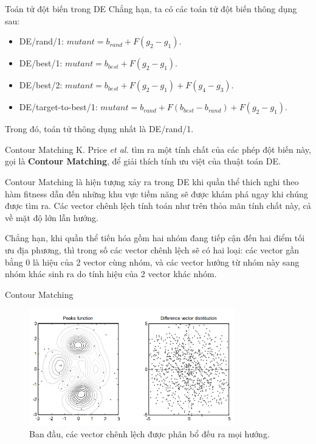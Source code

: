 \begin{frame}{Toán tử đột biến trong DE}
  Chẳng hạn, ta có các toán tử đột biến thông dụng sau:
\begin{itemize}
  \item DE/rand/1: \( mutant = b_{rand} + F(g_{2} - g_{1}) \).
\item DE/best/1: \( mutant = b_{best} + F(g_{2} - g_{1}) \).
\item DE/best/2: \( mutant = b_{best} + F(g_{2} - g_{1}) + F(g_{4} - g_{3}) \).
\item DE/target-to-best/1: \( mutant = b_{rand} + F(b_{best} - b_{rand}) +
  F(g_{2} - g_{1}) \).
\end{itemize}

Trong đó, toán tử thông dụng nhất là DE/rand/1.

\end{frame}

\begin{frame}{Contour Matching}
  K. Price \textit{et al.} tìm ra một tính chất của các phép đột biến này, gọi là
  \textbf{Contour Matching}, để giải thích tính ưu việt của thuật toán DE.

  Contour Matching là hiện tượng xảy ra trong DE khi quần thể thich nghi theo
  hàm fitness dẫn đến những khu vực tiềm năng sẽ được khám phá ngay khi chúng
  được tìm ra. Các vector chênh lệch tính toán như trên thỏa mãn tính chất này,
  cả về mặt độ lớn lẫn hướng.

  Chẳng hạn, khi quần thể tiến hóa gồm hai nhóm đang tiếp cận đến hai điểm tối
  ưu địa phương, thì trong số các vector chênh lệch sẽ có hai loại: các vector gần
  bằng \( 0 \) là hiệu của 2 vector cùng nhóm, và các vector hướng từ nhóm này sang
  nhóm khác sinh ra do tính hiệu của 2 vector khác nhóm.
\end{frame}

\begin{frame}{Contour Matching}
  \begin{figure}
    \centering
    \includegraphics[width=0.8\textwidth,height=0.8\textheight,
    keepaspectratio]{res/cm1.png}
\captionsetup{justification=centering,margin=3cm}
    \caption{Ban đầu, các vector chênh lệch được phân bổ đếu ra mọi hướng.}
  \end{figure}
\end{frame}

